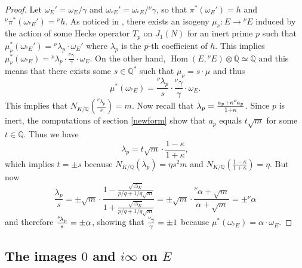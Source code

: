 \documentclass[11pt]{amsart}
\theoremstyle{definition}
\begin{document}
			\begin{proof}
				Let $\omega_E'=\omega_E/\gamma$ and $\omega_{{{}^\nu\!} E}'=\omega_{{{}^\nu\!} E}/{{}^\nu\!}\gamma$, so that $\pi^*(\omega_E')=h$ and ${{}^\nu\!}\pi^*(\omega_{{{}^\nu\!} E}')={{}^\nu\!} h$. As noticed in \cite[p. 488]{gola}, there exists an isogeny $\mu_{\nu}\colon E\to {{}^\nu\!} E$ induced by the action of some Hecke operator $T_p$ on $J_1(N)$ for an inert prime $p$ such that $\mu_{\nu}^*(\omega_{{{}^\nu\!} E}')={{}^\nu\!}\lambda_p\cdot\omega_E'$ where $\lambda_p$ is the $p$-th coefficient of $h$. This implies $\mu_{\nu}^*(\omega_{{{}^\nu\!} E})={{}^\nu\!}\lambda_p\cdot\frac{{{}^\nu\!}\gamma}{\gamma}\cdot\omega_E$. On the other hand, $\operatorname{Hom}(E,{{}^\nu\!} E)\otimes {\mathbb{Q}}\simeq {\mathbb{Q}}$ and this means that there exists some $s\in {\mathbb{Q}}^*$ such that $\mu_{\nu}=s\cdot \mu$ and thus
				$$\mu^*(\omega_{{{}^\nu\!} E})=\frac{{{}^\nu\!}\lambda_p}{s}\cdot\frac{{{}^\nu\!}\gamma}{\gamma}\cdot\omega_E.$$
				This implies that $N_{K/{\mathbb{Q}}}\left(\frac{{{}^\nu\!}\lambda_p}{s}\right)=m$. Now recall that ${\displaystyle} \lambda_p=\frac{a_p+\kappa{{}^\sigma\!} a_p}{1+\kappa}$. Since $p$ is inert, the computations of section \ref{newform} show that $a_p$ equals $t\sqrt{m}$ for some $t\in {\mathbb{Q}}$. Thus we have
				$$\lambda_p=t\sqrt{m}\cdot \frac{1-\kappa}{1+\kappa},$$
				which implies $t=\pm s$ because $N_{K/{\mathbb{Q}}}(\lambda_p)=\eta s^2 m$ and $N_{K/{\mathbb{Q}}}\left(\frac{1-\kappa}{1+\kappa}\right)=\eta$. But now
				$$\frac{\lambda_p}{s}=\pm\sqrt{m}\cdot\frac{1-\frac{\sqrt{\Delta_K}}{p/q+1/q\sqrt{m}}}{1+\frac{\sqrt{\Delta_K}}{p/q+1/q\sqrt{m}}}=\pm\sqrt{m}\cdot\frac{{{}^\nu\!}\alpha+\sqrt{m}}{\alpha+\sqrt{m}}=\pm {{}^\nu\!}\alpha$$
				and therefore ${\displaystyle} \frac{{{}^\nu\!}\lambda_p}{s}=\pm \alpha$, showing that ${\displaystyle} \frac{{{}^\nu\!}\gamma}{\gamma}=\pm 1$ because $\mu^*(\omega_{{{}^\nu\!} E})=\alpha\cdot\omega_E$.
		\end{proof}

		\subsection{The images \texorpdfstring{$0$}{} and
\texorpdfstring{$i\infty$}{} on \texorpdfstring{$E$}{}}
\end{document}
